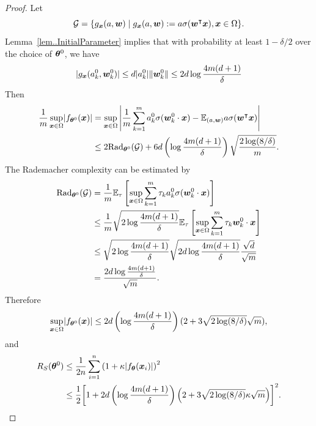 \documentclass[twoside,11pt]{article}
\begin{document}
\begin{proof}
    Let
    \begin{equation}
        \mathcal{G} = \{g_{\bm{x}}(a,\bm{w}) \mid g_{\bm{x}}(a,\bm{w}):=a\sigma(\bm{w}^\intercal\bm{x}),\bm{x}\in\Omega \}.
    \end{equation}
    Lemma~\ref{lem..InitialParameter} implies that with probability at least $1-\delta/2$ over the choice of $\bm{\theta}^0$, we have
    \begin{equation*}
        \lvert g_{\bm{x}}(a^0_k,\bm{w}^0_k)\rvert\leq d\lvert a_k^0\rvert\lVert\bm{w}^0_k\rVert\leq 2d\log\frac{4m(d+1)}{\delta}
    \end{equation*}
    Then
    \begin{equation*}
        \begin{aligned}
            \frac{1}{ m}\sup_{\bm{x}\in\Omega}\lvert f_{\bm{\theta}^0}(\bm{x})\rvert
             & =\sup_{\bm{x}\in\Omega}\left\lvert \frac{1}{m}\sum_{k=1}^m a_k^0\sigma(\bm{w}_k^0\cdot\bm{x})-\mathbb{E}_{(a,\bm{w})}a\sigma(\bm{w}^\intercal\bm{x})\right\rvert \\
             & \leq 2\mathrm{Rad}_{\bm{\theta}^0}(\mathcal{G}) + 6d \left(\log\frac{4m(d+1)}{\delta}\right)\sqrt{\frac{2\log(8/\delta)}{m}}.
        \end{aligned}
    \end{equation*}
    The Rademacher complexity can be estimated by
    \begin{equation*}
        \begin{aligned}
            \mathrm{Rad}_{\bm{\theta}^0}(\mathcal{G})
             & =\frac{1}{m}\mathbb{E}_{\tau}\left[\sup_{\bm{x}\in\Omega}\sum_{k=1}^m\tau_ka^0_k\sigma(\bm{w}^0_k\cdot\bm{x})\right]   \\
             & \leq\frac{1}{m}\sqrt{2\log\frac{4m(d+1)}{\delta}}\mathbb{E}_{\tau}\left[\sup_{\bm{x}\in\Omega}\sum_{k=1}^m\tau_k
            \bm{w}_k^0\cdot\bm{x}\right]                                                                                     \\
             & \leq\sqrt{2\log\frac{4m(d+1)}{\delta}}\sqrt{2d\log\frac{4m(d+1)}{\delta}}\frac{\sqrt{d}}{\sqrt{m}}      \\
             & =\frac{2d\log\frac{4m(d+1)}{\delta}}{\sqrt{m}}.
        \end{aligned}
    \end{equation*}
    Therefore
    \begin{equation*}
        \sup_{\bm{x}\in\Omega}\lvert f_{\bm{\theta}^0}(\bm{x})\rvert\leq 2d\left(\log\frac{4m(d+1)}{\delta}\right)(2+3\sqrt{2\log(8/\delta)}\sqrt{m}),
    \end{equation*}
    and
    \begin{equation*}
        \begin{aligned}
            R_S(\bm{\theta}^0)
             & \leq\frac{1}{2n}\sum_{i=1}^n{\left(1+\kappa\lvert f_{\bm{\theta}}(\bm{x}_i)\rvert\right)}^2                                                    \\
             & \leq\frac{1}{2}{\left[1+2d\left(\log\frac{4m(d+1)}{\delta}\right)\left(2+3\sqrt{2\log(8/\delta)}\kappa\sqrt{m}\right)\right]}^2.
        \end{aligned}
    \end{equation*}
\end{proof}
\end{document}
